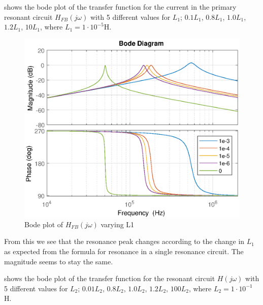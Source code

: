  shows the bode plot of the transfer function for the current in the primary resonant circuit $H_{FB}(j\omega)$ with 5 different values for $L_1$; $0.1 L_1$, $0.8 L_1$, $1.0 L_1$, $1.2 L_1$, $10 L_1$, where $L_1 = 1 \cdot 10^{-5}$H.
\begin{figure}[H]
    \centering
    \includegraphics[width=\textwidth]{img/FeedBackBode_L1.eps}
    \caption{Bode plot of $H_{FB}(j\omega)$ varying L1}
    \label{fig:fbbode_l1}
\end{figure}

From this we see that the resonance peak changes according to the change in $L_1$ as expected from the formula for resonance in a single resonance circuit. The magnitude seems to stay the same.

\newpage
{} shows the bode plot of the transfer function for the resonant circuit $H(j\omega)$ with 5 different values for $L_2$; $0.01 L_2$, $0.8 L_2$, $1.0 L_2$, $1.2 L_2$, $100 L_2$, where $L_2 = 1 \cdot 10^{-1}$H.

